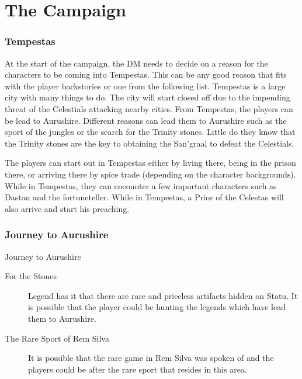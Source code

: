 
\chapter{The Campaign}

\subsection{Tempestas}

At the start of the campaign, the DM needs to decide on a reason for the characters to be coming into Tempestas. This can be any good reason that fits with the player backstories or one from the following list. Tempestas is a large city with many things to do. The city will start closed off due to the impending threat of the Celestials attacking nearby cities. From Tempestas, the players can be lead to Aurushire. Different reasons can lead them to Aurushire such as the sport of the jungles or the search for the Trinity stones. Little do they know that the Trinity stones are the key to obtaining the San'graal to defeat the Celestials.

The players can start out in Tempestas either by living there, being in the prison there, or arriving there by spice trade (depending on the character backgrounds). While in Tempestas, they can encounter a few important characters such as Dastan and the fortuneteller. While in Tempestas, a Prior of the Celestas will also arrive and start his preaching. 

\subsection{Journey to Aurushire}

\begin{commentbox}{Journey to Aurushire}
	\begin{description}
		\item[For the Stones] Legend has it that there are rare and priceless artifacts hidden on Statu. It is possible that the player could be hunting the legends which have lead them to Aurushire.
		\item[The Rare Sport of Rem Silva] It is possible that the rare game in Rem Silva was spoken of and the players could be after the rare sport that resides in this area.
	\end{description}
\end{commentbox}

